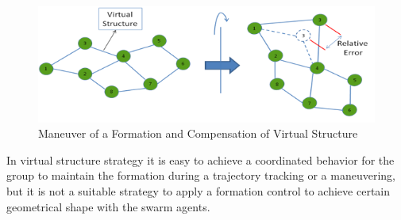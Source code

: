 \begin{figure}[H]
	\caption{Maneuver of a Formation and Compensation of Virtual Structure}
	\centering
	\includegraphics[scale = 0.95]{virtual_structure}
\end{figure}

In virtual structure strategy it is easy to achieve a coordinated behavior for the group to maintain the formation during a trajectory tracking or a maneuvering, but it is not a suitable strategy to apply a formation control to achieve certain geometrical shape with the swarm agents. 


